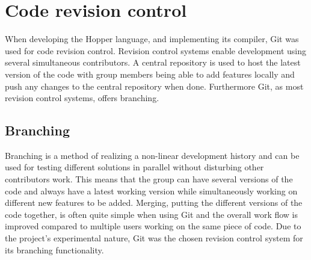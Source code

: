 \section{Code revision control}



When developing the Hopper language, and implementing its compiler, Git was used for code revision control.
Revision control systems enable development using several simultaneous contributors.
A central repository is used to host the latest version of the code with group members
being able to add features locally and push any changes to the central repository when done.  
Furthermore Git, as most revision control systems, offers branching. 

\subsection{Branching}

Branching is a method of realizing a non-linear development history and can be used for 
testing different solutions in parallel without disturbing other contributors work.
This means that the group can have several versions of the code and always have a
latest working version while simultaneously working on different new features
to be added. Merging, putting the different versions of the code together, is often
quite simple when using Git and the overall work flow is improved compared to
multiple users working on the same piece of code. 
Due to the project's experimental nature, Git was the chosen revision control system 
for its branching functionality.


